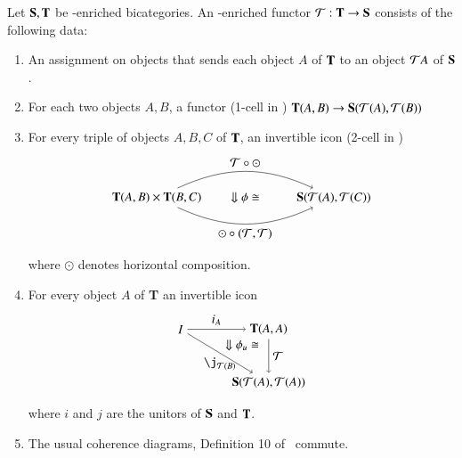 \begin{defn}\label{def:Iconfunc}
Let ${\bf S,T}$ be \Icon-enriched bicategories. An \Icon-enriched functor $\mathcal{T}: {\bf T} \rightarrow {\bf S}$ consists of the following data:
\begin{enumerate}
\item An assignment on objects that sends each object $A$ of ${\bf T}$ to an object $\mathcal{T} A$ of ${\bf S}$.
\item For each two objects $A,B$, a functor (1-cell in \Icon) ${\bf T}(A,B) \rightarrow {\bf S}(\mathcal{T}(A),\mathcal{T}(B))$
\item For every triple of objects $A,B,C$ of ${\bf T}$, an invertible icon (2-cell in \Icon) 
\begin{align} 
\begin{tikzpicture}
\node(1) at (0,0) {${\bf T}(A,B) \times {\bf T}(B,C)$};
\node(2) at (5,0) {${\bf S}(\cT(A),\cT(C))$};
\draw[->] (1) to[in=155, out=25] node[above]{$\cT \circ \odot$} (2); 
\draw[->] (1) to[in=-155, out=-25] node[below]{$\odot \circ (\cT,\cT)$} (2); 
\node at (2.5,0) {$\Downarrow \phi \iso$};
\end{tikzpicture}
\end{align}
where $\odot$ denotes horizontal composition.
\item For every object $A$ of {\bf T} an invertible icon
\begin{align}
\begin{tikzpicture}[xscale=.5, yscale=.3]
\node(1) at (0,0) {$I$};
\node(2) at (5,0) {${\bf T}(A,A)$};
\node(3) at (5,-5) {${\bf S}(\cT(A),\cT(A))$};
\draw[->] (1) to node[above]{$i_{A}$} (2); 
\draw[->] (1) to node[below]{$\j_{\cT(B)}$} (3);
\draw[->] (2) to node[right]{$\cT$} (3); 
\node at (3.5,-1.5) {$\Downarrow \phi_u \iso$};
\end{tikzpicture}
\end{align}
where $i$ and $j$ are the unitors of ${\bf S}$ and ${\bf T}$.
\item The usual coherence diagrams, Definition 10 of~\cite{nick:tricatsbook} commute.
\end{enumerate}
\end{defn}

